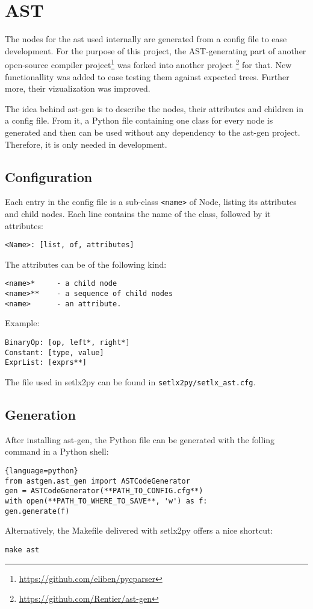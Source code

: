 
\section{AST}
\label{sec:ast}

The nodes for the \gls{ast} used  internally are generated from a config file to ease development. For the purpose of this project, the AST-generating part of another open-source compiler project\footnote{\url{https://github.com/eliben/pycparser}}  was forked into another project \footnote{\url{https://github.com/Rentier/ast-gen}} for that. New functionallity was added to ease testing them against expected trees.  Further more, their vizualization was improved.

The idea behind ast-gen is to describe the nodes, their attributes and children in a config file. From it, a Python file containing one class for every node is generated and then can be used without any dependency to the ast-gen project. Therefore, it is only needed in development.

\subsection{Configuration}

Each entry in the config file is a sub-class \texttt{<name>} of Node, listing its attributes and child nodes. Each line contains the name of the class, followed by it attributes:

\verb$<Name>: [list, of, attributes]$

The attributes can be of the following kind:

\begin{verbatim}
<name>*     - a child node
<name>**    - a sequence of child nodes
<name>      - an attribute.
\end{verbatim}

Example:

\begin{verbatim}
BinaryOp: [op, left*, right*]
Constant: [type, value]
ExprList: [exprs**]
\end{verbatim}

The file used in setlx2py can be found in \texttt{setlx2py/setlx_ast.cfg}.

\subsection{Generation}

After installing ast-gen, the Python file can be generated with the folling command in a Python shell:

\begin{lstlisting}{language=python}
from astgen.ast_gen import ASTCodeGenerator
gen = ASTCodeGenerator(**PATH_TO_CONFIG.cfg**)
with open(**PATH_TO_WHERE_TO_SAVE**, 'w') as f:
gen.generate(f)
\end{lstlisting}

Alternatively, the Makefile delivered with setlx2py offers a nice shortcut:

\verb$make ast$